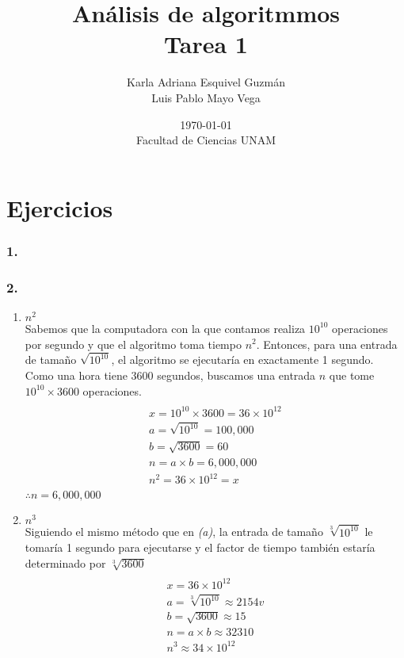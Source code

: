 \documentclass[12pt]{article}
\title{Análisis de algoritmmos \\ Tarea 1}
\author{Karla Adriana Esquivel Guzmán \\ Luis Pablo Mayo Vega}
\date{\today \\ Facultad de Ciencias UNAM}
\begin{document}
\maketitle

\section*{Ejercicios}
\subsubsection*{1.}
\subsubsection*{2.}
\begin{enumerate}[label=(\alph*)]
\item $n^2$\\
  Sabemos que la computadora con la que contamos realiza $10^{10}$ operaciones por segundo y que el algoritmo toma tiempo $n^2$. Entonces, para una entrada de tamaño $\sqrt{10^{10}}$, el algoritmo se ejecutaría en exactamente 1 segundo.\\
  Como una hora tiene 3600 segundos, buscamos una entrada $n$ que tome $10^{10}\times 3600$ operaciones.
  \begin{multline*}
    \\x = 10^{10} \times 3600 = 36 \times 10^{12}\\
    a = \sqrt{10^{10}} = 100,000\\
    b = \sqrt{3600}= 60\\
    n = a \times b = 6,000,000\\
    n^2 = 36 \times 10^{12} = x\\   
  \end{multline*}
  $\therefore n = 6,000,000$   
\item $n^3$\\
  Siguiendo el mismo método que en \textit{(a)}, la entrada de tamaño $\sqrt[3]{10^{10}}$ le tomaría 1 segundo para ejecutarse y el factor de tiempo también estaría determinado por $\sqrt[3]{3600}$
  \begin{multline*}
    \\x = 36 \times 10^{12}\\
    a = \sqrt[3]{10^{10}} \approx 2154v\\
    b = \sqrt{3600} \approx 15 \\
    n = a \times b \approx 32310\\
    n^3 \approx 34 \times 10^{12}\\   

\end{multline*}
\end{enumerate}
\end{document}
